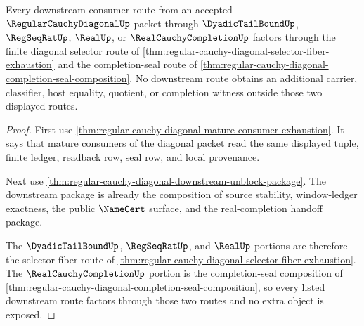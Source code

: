\begin{theorem}
\label{thm:regular-cauchy-diagonal-downstream-route-factorization}
Every downstream consumer route from an accepted $\RegularCauchyDiagonalUp$ packet through $\DyadicTailBoundUp$, $\RegSeqRatUp$, $\RealUp$, or $\RealCauchyCompletionUp$ factors through the finite diagonal selector route of \autoref{thm:regular-cauchy-diagonal-selector-fiber-exhaustion} and the completion-seal route of \autoref{thm:regular-cauchy-diagonal-completion-seal-composition}. No downstream route obtains an additional carrier, classifier, host equality, quotient, or completion witness outside those two displayed routes.
\end{theorem}
\begin{proof}
First use \autoref{thm:regular-cauchy-diagonal-mature-consumer-exhaustion}. It says that mature consumers of the diagonal packet read the same displayed tuple, finite ledger, readback row, seal row, and local provenance.

Next use \autoref{thm:regular-cauchy-diagonal-downstream-unblock-package}. The downstream package is already the composition of source stability, window-ledger exactness, the public $\NameCert$ surface, and the real-completion handoff package.

The $\DyadicTailBoundUp$, $\RegSeqRatUp$, and $\RealUp$ portions are therefore the selector-fiber route of \autoref{thm:regular-cauchy-diagonal-selector-fiber-exhaustion}. The $\RealCauchyCompletionUp$ portion is the completion-seal composition of \autoref{thm:regular-cauchy-diagonal-completion-seal-composition}, so every listed downstream route factors through those two routes and no extra object is exposed.
\end{proof}

